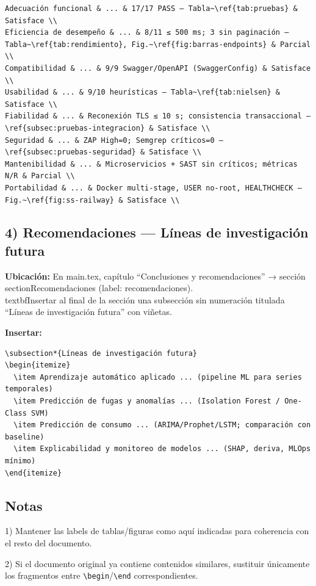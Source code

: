 \begin{verbatim}
Adecuación funcional & ... & 17/17 PASS — Tabla~\ref{tab:pruebas} & Satisface \\
Eficiencia de desempeño & ... & 8/11 ≤ 500 ms; 3 sin paginación — Tabla~\ref{tab:rendimiento}, Fig.~\ref{fig:barras-endpoints} & Parcial \\
Compatibilidad & ... & 9/9 Swagger/OpenAPI (SwaggerConfig) & Satisface \\
Usabilidad & ... & 9/10 heurísticas — Tabla~\ref{tab:nielsen} & Satisface \\
Fiabilidad & ... & Reconexión TLS ≤ 10 s; consistencia transaccional — \ref{subsec:pruebas-integracion} & Satisface \\
Seguridad & ... & ZAP High=0; Semgrep críticos=0 — \ref{subsec:pruebas-seguridad} & Satisface \\
Mantenibilidad & ... & Microservicios + SAST sin críticos; métricas N/R & Parcial \\
Portabilidad & ... & Docker multi-stage, USER no-root, HEALTHCHECK — Fig.~\ref{fig:ss-railway} & Satisface \\
\end{verbatim}

\subsection*{4) Recomendaciones — Líneas de investigación futura}

\textbf{Ubicación:} En main.tex, capítulo ``Conclusiones y recomendaciones'' → sección \\section{Recomendaciones} (label: recomendaciones). \\textbf{Insertar al final} de la sección una subsección sin numeración titulada ``Líneas de investigación futura'' con viñetas.

\textbf{Insertar:}

\begin{verbatim}
\subsection*{Líneas de investigación futura}
\begin{itemize}
  \item Aprendizaje automático aplicado ... (pipeline ML para series temporales)
  \item Predicción de fugas y anomalías ... (Isolation Forest / One-Class SVM)
  \item Predicción de consumo ... (ARIMA/Prophet/LSTM; comparación con baseline)
  \item Explicabilidad y monitoreo de modelos ... (SHAP, deriva, MLOps mínimo)
\end{itemize}
\end{verbatim}

\subsection*{Notas}

1) Mantener las labels de tablas/figuras como aquí indicadas para coherencia con el resto del documento.

2) Si el documento original ya contiene contenidos similares, sustituir únicamente los fragmentos entre \verb|\begin|/\verb|\end| correspondientes.

